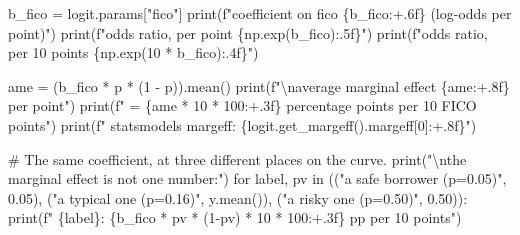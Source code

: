 \documentclass[
  letterpaper,
  10pt,
  twoside,
  openright,
  numbers=noenddot,
  chapterprefix=true]{scrbook}
\newenvironment{Shaded}{}{}
\newcommand{\BuiltInTok}[1]{\textcolor[rgb]{0.84,0.23,0.29}{#1}}
\newcommand{\CharTok}[1]{\textcolor[rgb]{0.01,0.18,0.38}{#1}}
\newcommand{\CommentTok}[1]{\textcolor[rgb]{0.42,0.45,0.49}{#1}}
\newcommand{\ControlFlowTok}[1]{\textcolor[rgb]{0.84,0.23,0.29}{#1}}
\newcommand{\DecValTok}[1]{\textcolor[rgb]{0.00,0.36,0.77}{#1}}
\newcommand{\FloatTok}[1]{\textcolor[rgb]{0.00,0.36,0.77}{#1}}
\newcommand{\KeywordTok}[1]{\textcolor[rgb]{0.84,0.23,0.29}{#1}}
\newcommand{\NormalTok}[1]{\textcolor[rgb]{0.14,0.16,0.18}{#1}}
\newcommand{\OperatorTok}[1]{\textcolor[rgb]{0.14,0.16,0.18}{#1}}
\newcommand{\SpecialCharTok}[1]{\textcolor[rgb]{0.00,0.36,0.77}{#1}}
\newcommand{\SpecialStringTok}[1]{\textcolor[rgb]{0.01,0.18,0.38}{#1}}
\newcommand{\StringTok}[1]{\textcolor[rgb]{0.01,0.18,0.38}{#1}}
\begin{document}
\label{check-effects}
\begin{Shaded}
\begin{Highlighting}[]
\NormalTok{b\_fico }\OperatorTok{=}\NormalTok{ logit.params[}\StringTok{"fico"}\NormalTok{]}
\BuiltInTok{print}\NormalTok{(}\SpecialStringTok{f"coefficient on fico         }\SpecialCharTok{\{}\NormalTok{b\_fico}\SpecialCharTok{:+.6f\}}\SpecialStringTok{  (log{-}odds per point)"}\NormalTok{)}
\BuiltInTok{print}\NormalTok{(}\SpecialStringTok{f"odds ratio, per point       }\SpecialCharTok{\{}\NormalTok{np}\SpecialCharTok{.}\NormalTok{exp(b\_fico)}\SpecialCharTok{:.5f\}}\SpecialStringTok{"}\NormalTok{)}
\BuiltInTok{print}\NormalTok{(}\SpecialStringTok{f"odds ratio, per 10 points   }\SpecialCharTok{\{}\NormalTok{np}\SpecialCharTok{.}\NormalTok{exp(}\DecValTok{10} \OperatorTok{*}\NormalTok{ b\_fico)}\SpecialCharTok{:.4f\}}\SpecialStringTok{"}\NormalTok{)}

\NormalTok{ame }\OperatorTok{=}\NormalTok{ (b\_fico }\OperatorTok{*}\NormalTok{ p }\OperatorTok{*}\NormalTok{ (}\DecValTok{1} \OperatorTok{{-}}\NormalTok{ p)).mean()}
\BuiltInTok{print}\NormalTok{(}\SpecialStringTok{f"}\CharTok{\textbackslash{}n}\SpecialStringTok{average marginal effect     }\SpecialCharTok{\{}\NormalTok{ame}\SpecialCharTok{:+.8f\}}\SpecialStringTok{ per point"}\NormalTok{)}
\BuiltInTok{print}\NormalTok{(}\SpecialStringTok{f"  = }\SpecialCharTok{\{}\NormalTok{ame }\OperatorTok{*} \DecValTok{10} \OperatorTok{*} \DecValTok{100}\SpecialCharTok{:+.3f\}}\SpecialStringTok{ percentage points per 10 FICO points"}\NormalTok{)}
\BuiltInTok{print}\NormalTok{(}\SpecialStringTok{f"  statsmodels margeff:      }\SpecialCharTok{\{}\NormalTok{logit}\SpecialCharTok{.}\NormalTok{get\_margeff()}\SpecialCharTok{.}\NormalTok{margeff[}\DecValTok{0}\NormalTok{]}\SpecialCharTok{:+.8f\}}\SpecialStringTok{"}\NormalTok{)}

\CommentTok{\# The same coefficient, at three different places on the curve.}
\BuiltInTok{print}\NormalTok{(}\StringTok{"}\CharTok{\textbackslash{}n}\StringTok{the marginal effect is not one number:"}\NormalTok{)}
\ControlFlowTok{for}\NormalTok{ label, pv }\KeywordTok{in}\NormalTok{ ((}\StringTok{"a safe borrower  (p=0.05)"}\NormalTok{, }\FloatTok{0.05}\NormalTok{),}
\NormalTok{                  (}\StringTok{"a typical one    (p=0.16)"}\NormalTok{, y.mean()),}
\NormalTok{                  (}\StringTok{"a risky one      (p=0.50)"}\NormalTok{, }\FloatTok{0.50}\NormalTok{)):}
    \BuiltInTok{print}\NormalTok{(}\SpecialStringTok{f"  }\SpecialCharTok{\{}\NormalTok{label}\SpecialCharTok{\}}\SpecialStringTok{: }\SpecialCharTok{\{}\NormalTok{b\_fico }\OperatorTok{*}\NormalTok{ pv }\OperatorTok{*}\NormalTok{ (}\DecValTok{1}\OperatorTok{{-}}\NormalTok{pv) }\OperatorTok{*} \DecValTok{10} \OperatorTok{*} \DecValTok{100}\SpecialCharTok{:+.3f\}}\SpecialStringTok{ pp per 10 points"}\NormalTok{)}
\end{Highlighting}
\end{Shaded}
\end{document}
